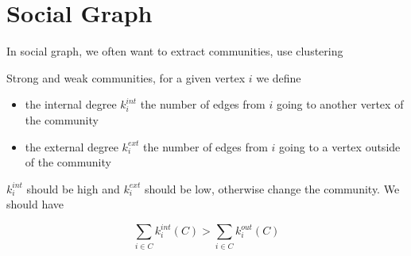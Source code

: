 
\section{Social Graph}

In social graph, we often want to extract communities, use clustering


Strong and weak communities, for a given vertex $i$ we define

\begin{itemize}
  \item the internal degree $k_i^{int}$ the number of edges from $i$ going to another vertex of the community
  \item the external degree $k_i^{ext}$ the number of edges from $i$ going to a vertex outside of the community
\end{itemize}

$k_i^{int}$ should be high and $k_i^{ext}$ should be low, otherwise change the community. We should have

\[
  \sum_{i\in C} k_i^{int}(C) > \sum_{i\in C} k_i^{out}(C)
\]

